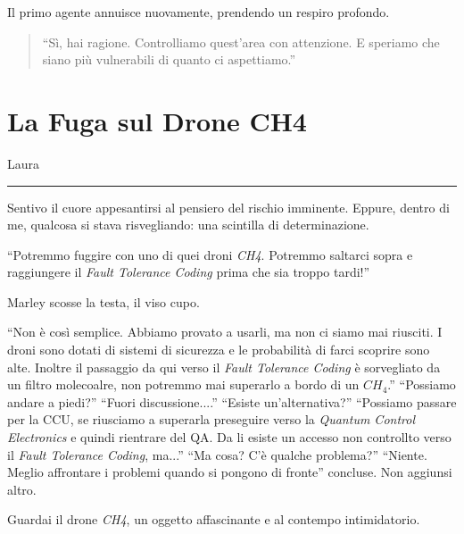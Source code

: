 Il primo agente annuisce nuovamente, prendendo un respiro profondo.

\begin{quote}
\enquote{Sì, hai ragione. Controlliamo quest'area con attenzione. E speriamo che siano più vulnerabili di quanto ci aspettiamo.}
\end{quote}

\section{La Fuga sul Drone CH4}
\vspace{1em}
\begin{center}Laura\end{center}
\hrule
\vspace{1em}

 Sentivo il cuore appesantirsi al pensiero del rischio imminente. Eppure, dentro di me, qualcosa si stava risvegliando: una scintilla di determinazione.

\begin{dialogue}
 \enquote{Potremmo fuggire con uno di quei droni \textit{CH4}. Potremmo saltarci sopra e raggiungere il \textit{Fault Tolerance Coding} prima che sia troppo tardi!}
\end{dialogue}

Marley scosse la testa, il viso cupo.

\begin{dialogue}
 \enquote{Non è così semplice. Abbiamo provato a usarli, ma non ci siamo mai riusciti. I droni sono dotati di sistemi di sicurezza e le probabilità di farci scoprire sono alte. Inoltre il passaggio da qui verso il \textit{Fault Tolerance Coding} è sorvegliato da un filtro molecoalre, non potremmo mai superarlo a bordo di un $CH_4$.}
 \enquote{Possiamo andare a piedi?}
 \enquote{Fuori discussione....}
 \enquote{Esiste un'alternativa?}
 \enquote{Possiamo passare per la CCU, se riusciamo a superarla preseguire verso la \textit{Quantum Control Electronics}  e quindi rientrare del QA. Da li esiste un accesso non controllto verso il \textit{Fault Tolerance Coding}, ma...}
 \enquote{Ma cosa? C'è qualche problema?}
 \enquote{Niente. Meglio affrontare i problemi quando si pongono di fronte} concluse. Non aggiunsi altro. 
\end{dialogue}

Guardai il drone \textit{CH4}, un oggetto affascinante e al contempo intimidatorio.

